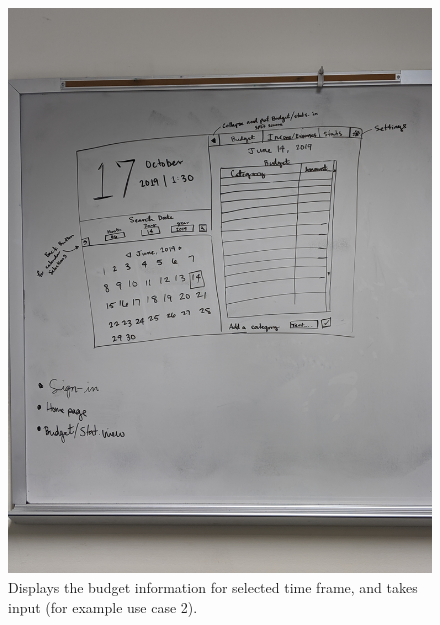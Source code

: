 \documentclass[10pt,conference,onecolumn,compsoc]{IEEEtran}
\begin{document}
\begin{figure}[h]
\begin{minipage}{.5\textwidth}
\includegraphics[scale = .05]{BudgetView.jpg}
\caption{Displays the budget information for selected time frame, and takes input (for example use case 2).}
\label{BudgetScreen}
\end{minipage}
\end{figure}
\end{document}
